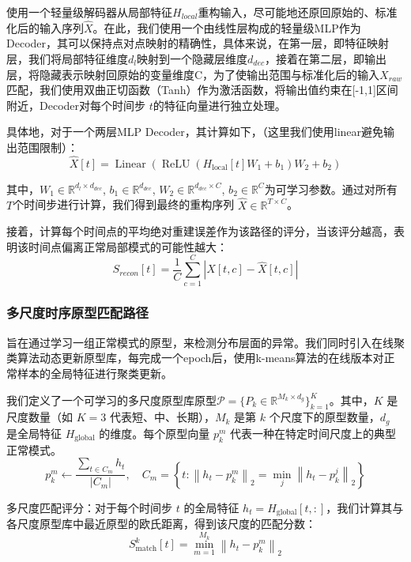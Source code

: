 \documentclass{setp-new}
\begin{document}
使用一个轻量级解码器从局部特征\(H_{local}\)重构输入，尽可能地还原回原始的、标准化后的输入序列\(\hat{X}\)。在此，我们使用一个由线性层构成的轻量级MLP作为Decoder，其可以保持点对点映射的精确性，具体来说，在第一层，即特征映射层，我们将局部特征维度\(d_l\)映射到一个隐藏层维度\(d_{dec}\)，接着在第二层，即输出层，将隐藏表示映射回原始的变量维度C，为了使输出范围与标准化后的输入\(X_{raw}\)匹配，我们使用双曲正切函数（Tanh）作为激活函数，将输出值约束在[-1,1]区间附近，Decoder对每个时间步 $t$的特征向量进行独立处理。

具体地，对于一个两层MLP Decoder，其计算如下，（这里我们使用linear避免输出范围限制）：
\begin{equation}
\hat{X}[t]=\operatorname{Linear}\left(\operatorname{ReLU}\left(H_{\text{local}}[t] W_1+b_1\right) W_2+b_2\right)
\end{equation}

其中，$W_1 \in \mathbb{R}^{d_l \times d_{dec}}$, $b_1 \in \mathbb{R}^{d_{dec}}$, $W_2 \in \mathbb{R}^{d_{dec} \times C}$, $b_2 \in \mathbb{R}^{C}$为可学习参数。通过对所有 $T$个时间步进行计算，我们得到最终的重构序列 $\hat{X} \in \mathbb{R}^{T\times C}$。

接着，计算每个时间点的平均绝对重建误差作为该路径的评分，当该评分越高，表明该时间点偏离正常局部模式的可能性越大：
\begin{equation}
S_{recon}[t] = \frac{1}{C} \sum_{c=1}^{C} |X[t,c] - \hat{X}[t,c]|
\end{equation}

\subsubsection{多尺度时序原型匹配路径}
旨在通过学习一组正常模式的原型，来检测分布层面的异常。我们同时引入在线聚类算法动态更新原型库，每完成一个epoch后，使用k-means算法的在线版本对正常样本的全局特征进行聚类更新。

我们定义了一个可学习的多尺度原型库原型$\mathcal{P} = \{P_k \in \mathbb{R}^{M_k \times d_g}\}_{k=1}^K$。其中，$K$ 是尺度数量（如 $K = 3$ 代表短、中、长期），$M_k$ 是第 $k$ 个尺度下的原型数量，$d_g$ 是全局特征 $H_{\text{global}}$ 的维度。每个原型向量 $p_k^m$ 代表一种在特定时间尺度上的典型正常模式。
\begin{equation}
p_k^m \leftarrow \frac{\sum_{t \in C_m} h_t}{|C_m|}, \quad C_m = \left\{ t : \left\| h_t - p_k^m \right\|_2 = \min_j \left\| h_t - p_k^j \right\|_2 \right\}
\end{equation}


多尺度匹配评分：对于每个时间步 $t$ 的全局特征 $h_t = H_{\text{global}}[t, :]$，我们计算其与各尺度原型库中最近原型的欧氏距离，得到该尺度的匹配分数：
\begin{equation}
S_{\text{match}}^k[t] = \min_{m=1}^{M_k} \left\| h_t - p_k^m \right\|_2
\end{equation}
\end{document}
